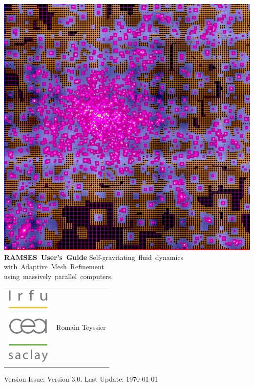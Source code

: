 \begin{titlepage}
   \flushright
   \begin{minipage}{0.6\linewidth}
      \flushright
      \includegraphics[width=\linewidth]{img/amr.png}
      \vskip 1cm
      {\huge \textbf{RAMSES~User's~Guide}}
      \vskip 2cm
      \Large
                  Self-gravitating~fluid~dynamics\\
      \vskip 5mm  with~Adaptive~Mesh~Refinement\\
      \vskip 5mm  using~massively~parallel~computers.
      \vskip 2cm

      \begin{tabular}{m{}m{}@{}}
      \includegraphics[height=4cm]{img/irfu.pdf} & {\hfill \large Romain Teyssier}
      \end{tabular}
   \end{minipage}
   \vfill
   \dblrule
   \flushright
   Version Issue: Version 3.0. Last Update: \today
\end{titlepage}
